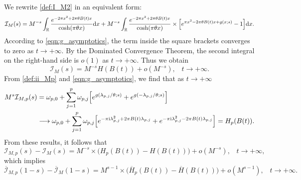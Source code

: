 \documentclass[12pt]{article}
\def\r{{\mathbb R}}
\def\d{{\textnormal d}}
\def\i{{\textnormal i}}
\def\ii{{\mathcal I}}
\theoremstyle{definition}
\begin{document}
We rewrite \eqref{def:I_M2} in an equivalent form:
\begin{equation*}
{\mathcal I}_M(s)=M^{-s}  \int_{\r} \frac{e^{-2\pi x^2+2\pi \theta B(t) x}}{\cosh(\pi \theta x)} 
  \d x 
  + M^{-s} \int_{\r} \frac{e^{-2\pi x^2+2\pi \theta B(t) x}}{\cosh(\pi \theta x)}
  \times \Big[e^{\pi x^2- 2\pi \theta B(t) x+g(x;s)} -1 \Big] \d x.
 \end{equation*} 
According to \eqref{eqn:g_asymptotics}, the term inside the square brackets converges to zero as $t \to  +\infty$. 
By the Dominated Convergence Theorem, the second integral on the right-hand side is $o(1)$ as $t\to +\infty$. Thus we obtain 
\begin{equation*}
{\mathcal I}_M(s)=M^{-s} H(B(t)) + o(M^{-s}), \;\;\; t \to +\infty.
\end{equation*}
From \eqref{def:ii_Mp} and \eqref{eqn:g_asymptotics}, we find that as $t\to +\infty$
\begin{align*}
M^{s} \ii_{M,p}(s)&= \omega_{p,0}    +  \sum\limits_{j=1}^p 
\omega_{p,j} \Big[
e^{g(\lambda_{p,j}/\theta;s)} 
 +e^{g(-\lambda_{p,j}/\theta;s)}  \Big] \\&\longrightarrow
 \omega_{p,0}    +  \sum\limits_{j=1}^p 
\omega_{p,j} \Big[
e^{- \pi \i \lambda_{p,j}^2 + 2\pi B(t) \lambda_{p,j} } 
 +e^{- \pi \i \lambda_{p,j}^2 - 2\pi B(t) \lambda_{p,j} }   \Big]
 = H_p(B(t)).
\end{align*}
From these results, it follows that
\begin{equation}\label{I_M_error}
\ii_{M,p}(s)-\ii_{M}(s)=M^{-s} \times \big( H_p(B(t))-H(B(t)) \big) + o(M^{-s}), \;\;\; t\to +\infty,
\end{equation}
which implies
\begin{equation}\label{bar_I_M_error}
\overline \ii_{M,p}(1-s)-\overline \ii_{M}(1-s)=M^{s-1} \times \big( \overline H_p(B(t))-\overline H(B(t)) \big) + o(M^{s-1}), \;\;\; t\to +\infty. 
\end{equation}
\end{document}
